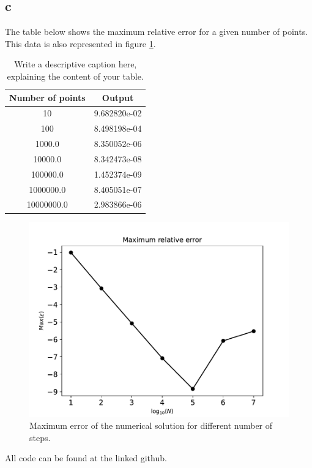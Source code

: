 \documentclass[english,notitlepage]{revtex4-1}  %
\begin{document}
    \newpage
    \subsection*{c}
    The table below shows the maximum relative error for a given number of points.
    This data is also represented in figure \ref{max_error}.
    \begin{table}[ht!]
        \centering
        \begin{tabular}{c@{\hspace{1cm}} c}
            \hline
            Number of points & Output \\
            \hline
            10 &  9.682820e-02\\
            100 &  8.498198e-04\\
            1000.0 & 8.350052e-06\\
            10000.0  & 8.342473e-08\\
            100000.0 & 1.452374e-09\\
            1000000.0 & 8.405051e-07\\
            10000000.0 & 2.983866e-06\\
            \hline
        \end{tabular}\caption{Write a descriptive caption here, explaining the content of your table.}\label{tab:output_table}
    \end{table}  
    
    \begin{figure}[!ht]
        \centering
        \includegraphics[scale=0.6]{max_error.pdf}
        \caption{Maximum error of the numerical solution for different number of steps.}
        \label{max_error}
    \end{figure}
    All code can be found at the linked github.
\end{document}
